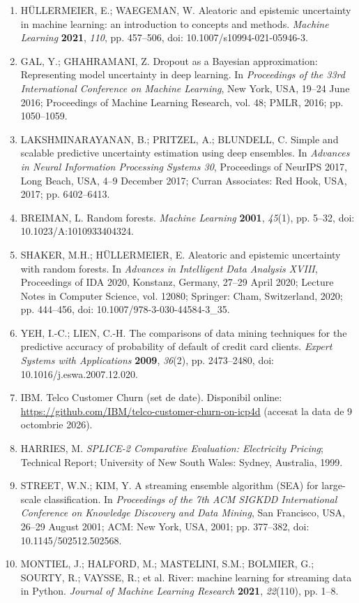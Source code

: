 \documentclass[12pt,a4paper]{article}
\begin{document}
{\begin{enumerate}[label=\arabic*.,leftmargin=1cm,labelsep=0.25cm,itemsep=0pt,parsep=0pt,topsep=2pt,align=left]
\item HÜLLERMEIER, E.; WAEGEMAN, W. Aleatoric and epistemic uncertainty in machine learning: an introduction to concepts and methods. \textit{Machine Learning} \textbf{2021}, \textit{110}, pp. 457–506, doi: 10.1007/s10994-021-05946-3.
\item GAL, Y.; GHAHRAMANI, Z. Dropout as a Bayesian approximation: Representing model uncertainty in deep learning. In \textit{Proceedings of the 33rd International Conference on Machine Learning}, New York, USA, 19–24 June 2016; Proceedings of Machine Learning Research, vol. 48; PMLR, 2016; pp. 1050–1059.
\item LAKSHMINARAYANAN, B.; PRITZEL, A.; BLUNDELL, C. Simple and scalable predictive uncertainty estimation using deep ensembles. In \textit{Advances in Neural Information Processing Systems 30}, Proceedings of NeurIPS 2017, Long Beach, USA, 4–9 December 2017; Curran Associates: Red Hook, USA, 2017; pp. 6402–6413.
\item BREIMAN, L. Random forests. \textit{Machine Learning} \textbf{2001}, \textit{45}(1), pp. 5–32, doi: 10.1023/A:1010933404324.
\item SHAKER, M.H.; HÜLLERMEIER, E. Aleatoric and epistemic uncertainty with random forests. In \textit{Advances in Intelligent Data Analysis XVIII}, Proceedings of IDA 2020, Konstanz, Germany, 27–29 April 2020; Lecture Notes in Computer Science, vol. 12080; Springer: Cham, Switzerland, 2020; pp. 444–456, doi: 10.1007/978-3-030-44584-3\_35.
\item YEH, I.-C.; LIEN, C.-H. The comparisons of data mining techniques for the predictive accuracy of probability of default of credit card clients. \textit{Expert Systems with Applications} \textbf{2009}, \textit{36}(2), pp. 2473–2480, doi: 10.1016/j.eswa.2007.12.020.
\item IBM. Telco Customer Churn (set de date). Disponibil online: \url{https://github.com/IBM/telco-customer-churn-on-icp4d} (accesat la data de 9 octombrie 2026).
\item HARRIES, M. \textit{SPLICE-2 Comparative Evaluation: Electricity Pricing}; Technical Report; University of New South Wales: Sydney, Australia, 1999.
\item STREET, W.N.; KIM, Y. A streaming ensemble algorithm (SEA) for large-scale classification. In \textit{Proceedings of the 7th ACM SIGKDD International Conference on Knowledge Discovery and Data Mining}, San Francisco, USA, 26–29 August 2001; ACM: New York, USA, 2001; pp. 377–382, doi: 10.1145/502512.502568.
\item MONTIEL, J.; HALFORD, M.; MASTELINI, S.M.; BOLMIER, G.; SOURTY, R.; VAYSSE, R.; et al. River: machine learning for streaming data in Python. \textit{Journal of Machine Learning Research} \textbf{2021}, \textit{22}(110), pp. 1–8.

\end{enumerate}}
\end{document}
